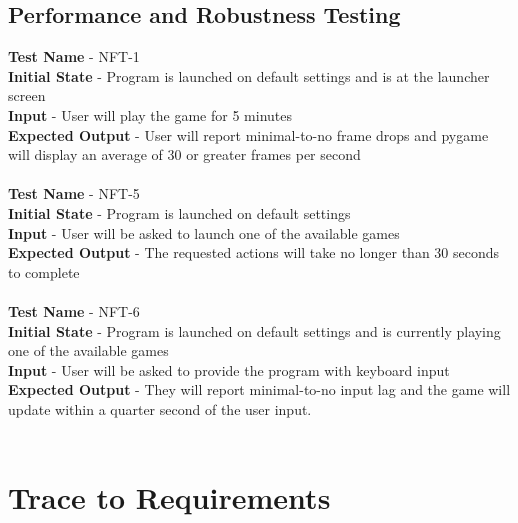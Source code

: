 \documentclass[12pt, titlepage]{article}
\begin{document}
\subsection{Performance and Robustness Testing}
\textbf{Test Name} - NFT-1\\
\textbf{Initial State} - Program is launched on default settings and is at the launcher screen \\
\textbf{Input} - User will play the game for 5 minutes\\
\textbf{Expected Output} - User will report minimal-to-no frame drops and pygame will display an average of 30 or greater frames per second\\ \\ 
\textbf{Test Name} - NFT-5\\
\textbf{Initial State} - Program is launched on default settings\\
\textbf{Input} - User will be asked to launch one of the available games\\
\textbf{Expected Output} - The requested actions will take no longer than 30 seconds to complete\\ \\ 
\textbf{Test Name} - NFT-6\\
\textbf{Initial State} - Program is launched on default settings and is currently playing one of the available games\\
\textbf{Input} - User will be asked to provide the program with keyboard input\\
\textbf{Expected Output} - They will report minimal-to-no input lag and the game will update within a quarter second of the user input.\\ \\ 

\section{Trace to Requirements}	
\end{document}
